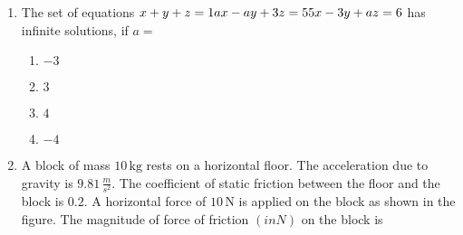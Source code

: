 \documentclass{article}
\newcommand{\brak}[1]{\left( #1 \right)}
\begin{document}
\begin{enumerate}
\item The set of equations
$
x + y + z = 1 \\
a x - a y + 3 z = 5 \\
5 x - 3 y + a z = 6
$
has infinite solutions, if $a =$

\begin{enumerate}
    \item $-3$
    \item $3$
    \item $4$
    \item $-4$
\end{enumerate}

\item A block of mass $10 \, \text{kg}$ rests on a horizontal floor. The acceleration due to gravity is $9.81 \, \frac{m}{s^2}$. The coefficient of static friction between the floor and the block is $0.2$. A horizontal force of $10 \, \text{N}$ is applied on the block as shown in the figure. The magnitude of force of friction $\brak{in N}$ on the block is

\begin{figure}[!ht]
\centering
{}%

\label{fig:my_label}
\end{figure}

\end{enumerate}
\end{document}
